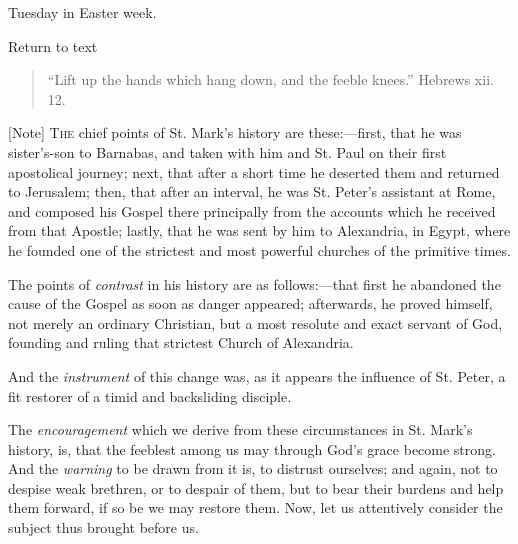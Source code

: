 
Tuesday in Easter week.

Return to text


\begin{quote}

``Lift up the hands which hang down, and the feeble
knees.'' Hebrews xii. 12.

\end{quote}

[Note] T\textsc{he} chief points of St.
Mark's history are these:—first, that he was sister's-son to Barnabas,
and taken with him and St. Paul on their first apostolical journey;
next, that after a short time he deserted them and returned to
Jerusalem; then, that after an interval, he was St. Peter's assistant at
Rome, and composed his Gospel there principally from the accounts which
he received from that Apostle; lastly, that he was sent by him to
Alexandria, in Egypt, where he founded one of the strictest and most
powerful churches of the primitive times.

The points of \emph{contrast} in his history are as follows:—that
first he abandoned the cause of the Gospel as soon as danger appeared;
afterwards, he proved himself, not merely an ordinary Christian, but a
most resolute and exact servant of God, founding and ruling that
strictest Church of Alexandria.

And the \emph{instrument} of this change was, as it appears the
influence of St. Peter, a fit restorer of a timid and backsliding
disciple.

The \emph{encouragement} which we derive from these circumstances in
St. Mark's history, is, that the feeblest among us may through God's
grace become strong. And the \emph{warning} to be drawn from it is, to
distrust ourselves; and again, not to despise weak brethren, or to
despair of them, but to bear their burdens and help them forward, if so
be we may restore them. Now, let us attentively consider the subject
thus brought before us.

